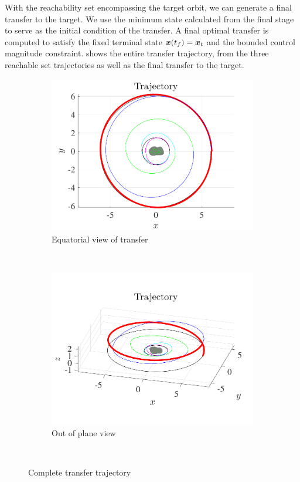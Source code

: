 \documentclass[]{aiaa-tc}%
\begin{document}
With the reachability set encompassing the target orbit, we can generate a final transfer to the target.
We use the minimum state calculated from the final stage to serve as the initial condition of the transfer.
A final optimal transfer is computed to satisfy the fixed terminal state \( \bm{x}(t_f) = \bm{x}_t \) and the bounded control magnitude constraint.
 shows the entire transfer trajectory, from the three reachable set trajectories as well as the final transfer to the target.
\begin{figure}[htbp] 
    \centering 
    \begin{subfigure}[htbp]{0.45\textwidth} 
        \includegraphics[width=\textwidth]{figures/trajectory.pdf} 
        \caption{Equatorial view of transfer} \label{fig:trajectory_up} 
    \end{subfigure}~
    \begin{subfigure}[htbp]{0.45\textwidth} 
        \includegraphics[width=\textwidth]{figures/trajectory_3d.pdf} 
        \caption{Out of plane view} \label{fig:trajectory_3d} 
    \end{subfigure}~ 
    \caption{Complete transfer trajectory}
    \label{fig:trajectory} 
\end{figure}
\end{document}
